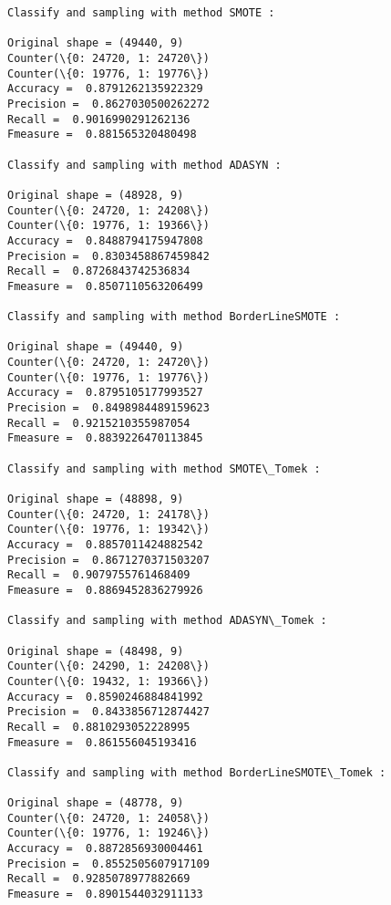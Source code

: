 \documentclass[11pt]{article}
\begin{document}
    \begin{Verbatim}[commandchars=\\\{\}]
Classify and sampling with method SMOTE :

Original shape = (49440, 9)
Counter(\{0: 24720, 1: 24720\})
Counter(\{0: 19776, 1: 19776\})
Accuracy =  0.8791262135922329
Precision =  0.8627030500262272
Recall =  0.9016990291262136
Fmeasure =  0.881565320480498

Classify and sampling with method ADASYN :

Original shape = (48928, 9)
Counter(\{0: 24720, 1: 24208\})
Counter(\{0: 19776, 1: 19366\})
Accuracy =  0.8488794175947808
Precision =  0.8303458867459842
Recall =  0.8726843742536834
Fmeasure =  0.8507110563206499

Classify and sampling with method BorderLineSMOTE :

Original shape = (49440, 9)
Counter(\{0: 24720, 1: 24720\})
Counter(\{0: 19776, 1: 19776\})
Accuracy =  0.8795105177993527
Precision =  0.8498984489159623
Recall =  0.9215210355987054
Fmeasure =  0.8839226470113845

Classify and sampling with method SMOTE\_Tomek :

Original shape = (48898, 9)
Counter(\{0: 24720, 1: 24178\})
Counter(\{0: 19776, 1: 19342\})
Accuracy =  0.8857011424882542
Precision =  0.8671270371503207
Recall =  0.9079755761468409
Fmeasure =  0.8869452836279926

Classify and sampling with method ADASYN\_Tomek :

Original shape = (48498, 9)
Counter(\{0: 24290, 1: 24208\})
Counter(\{0: 19432, 1: 19366\})
Accuracy =  0.8590246884841992
Precision =  0.8433856712874427
Recall =  0.8810293052228995
Fmeasure =  0.861556045193416

Classify and sampling with method BorderLineSMOTE\_Tomek :

Original shape = (48778, 9)
Counter(\{0: 24720, 1: 24058\})
Counter(\{0: 19776, 1: 19246\})
Accuracy =  0.8872856930004461
Precision =  0.8552505607917109
Recall =  0.9285078977882669
Fmeasure =  0.8901544032911133


    \end{Verbatim}
\end{document}
